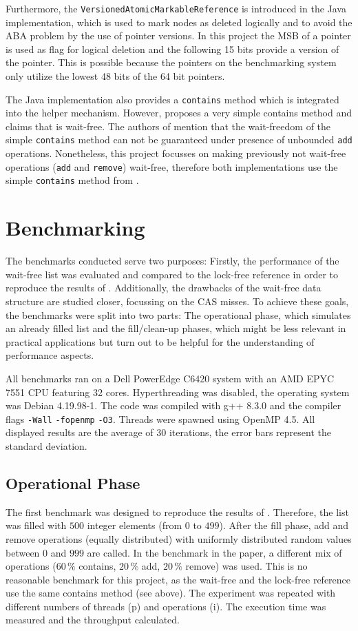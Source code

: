 \documentclass[a4paper, 12pt]{article}
\begin{document}
Furthermore, the \verb|VersionedAtomicMarkableReference| is introduced in the Java implementation, which is used to mark nodes as deleted logically and to avoid the ABA problem by the use of pointer versions. In this project the MSB of a pointer is used as flag for logical deletion and the following 15 bits provide a version of the pointer. This is possible because the pointers on the benchmarking system only utilize the lowest 48 bits of the 64 bit pointers.

The Java implementation also provides a \verb|contains| method which is integrated into the helper mechanism. However, \cite{herlihy12} proposes a very simple contains method and claims that is wait-free. The authors of \cite{timnat12} mention that the wait-freedom of the simple \verb|contains| method can not be guaranteed under presence of unbounded \verb|add| operations. Nonetheless, this project focusses on making previously not wait-free operations (\verb|add| and \verb|remove|) wait-free, therefore both implementations use the simple \verb|contains| method from \cite{herlihy12}.

\section{Benchmarking}

The benchmarks conducted serve two purposes: Firstly, the performance of the wait-free list was evaluated and compared to the lock-free reference in order to reproduce the results of \cite{timnat12}. Additionally, the drawbacks of the wait-free data structure are studied closer, focussing on the CAS misses. To achieve these goals, the benchmarks were split into two parts: The operational phase, which simulates an already filled list and the fill/clean-up phases, which might be less relevant in practical applications but turn out to be helpful for the understanding of performance aspects.

All benchmarks ran on a Dell PowerEdge C6420 system with an AMD EPYC 7551 CPU featuring 32 cores. Hyperthreading was disabled, the operating system was Debian 4.19.98-1. The code was compiled with g++ 8.3.0 and the compiler flags \verb|-Wall| \verb|-fopenmp| \verb|-O3|. Threads were spawned using OpenMP 4.5. All displayed results are the average of 30 iterations, the error bars represent the standard deviation.


\subsection{Operational Phase}
The first benchmark was designed to reproduce the results of \cite{timnat12}. Therefore, the list was filled with $500$ integer elements (from $0$ to $499$). After the fill phase, add and remove operations (equally distributed) with uniformly distributed random values between $0$ and $999$ are called. In the benchmark in the paper, a different mix of operations ($60\,\%$ contains, $20\,\%$ add, $20\,\%$ remove) was used. This is no reasonable benchmark for this project, as the wait-free and the lock-free reference use the same contains method (see above). The experiment was repeated with different numbers of threads (p) and operations (i). The execution time was measured and the throughput calculated.
\end{document}
